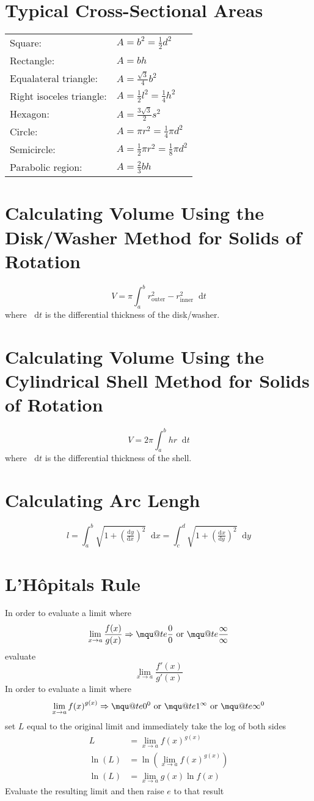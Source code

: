 \documentclass[12pt]{article}
\makeatletter
\renewcommand*{\implies}{\Rightarrow}
\newcommand*{\dd}[3][]{\tfrac{\mathrm{d}^{#1}#2}{\mathrm{d}#3^{#1}}}
\newcommand*{\D}[1]{\mathop{}\!\mathrm{d} #1}
\newcommand{\mquote}[1]{{\mathpalette\mqu@te{#1}}}
\newcommand{\mqu@te}[2]{%
  \sbox0{\(\m@th#1\text{``}\)}%
  \sbox1{\(\m@th#1\text{''}\)}%
  \sbox2{\(\m@th#1#2\)}%
  \ifdim\ht2>\ht0
    \raisebox{\dimexpr\ht2-\height}{\box0}%
    #2%
    \raisebox{\dimexpr\ht2-\height}{\box1}%
  \else
    \box0 #2\box1
  \fi
}
\newenvironment{rmbskip}{\setlength{\belowdisplayskip}{0pt}\ignorespaces}%
  {\ignorespacesafterend}
\makeatother
\begin{document}
\section*{Typical Cross-Sectional Areas}
{\renewcommand{\arraystretch}{1.5}\begin{tabular}{l@{ }l}
  Square: & \(A = b^2 = \frac{1}{2}d^2\)\\
  Rectangle: & \(A = bh\)\\
  Equalateral triangle: & \(A = \frac{\sqrt{3}}{4}b^2\)\\
  Right isoceles triangle: & \(A = \frac{1}{2}l^2 = \frac{1}{4}h^2\)\\
  Hexagon: & \(A = \frac{3\sqrt{3}}{2} s^2\)\\
  Circle: & \(A = \pi r^2 = \frac{1}{4}\pi d^2\)\\
  Semicircle: & \(A = \frac{1}{2}\pi r^2 = \frac{1}{8}\pi d^2\)\\
  Parabolic region: & \(A = \frac{2}{3}bh\)
\end{tabular}}
\section*{Calculating Volume Using the Disk\slash Washer Method for Solids of
Rotation}
\[
  V = \pi\int_a^b r_{\text{outer}}^2 - r_{\text{inner}}^2 \D{t}
\]
where \(\D{t}\) is the differential thickness of the disk\slash washer.
\section*{Calculating Volume Using the Cylindrical Shell Method for Solids of
Rotation}
\[
  V = 2\pi \int_a^b hr \D{t}
\]
where \(\D{t}\) is the differential thickness of the shell.
\section*{Calculating Arc Lengh}
\begin{rmbskip}
  \[
    l = \int_a^b \sqrt{1+{\left(\dd{y}{x}\right)}^2} \D{x}
    = \int_c^d \sqrt{1+{\left(\dd{x}{y}\right)}^2} \D{y}
  \]
\end{rmbskip}
\section*{L'H\^{o}pitals Rule}
In order to evaluate a limit where
\[
  \lim_{x \to a} \frac{f(x)}{g(x)} \implies \mquote{\frac{0}{0}} \text{ or }
  \mquote{\frac{\infty}{\infty}}
\]
evaluate
\[
  \lim_{x \to a} \frac{f'(x)}{g'(x)}
\]
In order to evaluate a limit where
\[
  \lim_{x \to a} {f(x)}^{g(x)} \implies \mquote{0^0} \text{ or }
  \mquote{1^\infty} \text{ or } \mquote{\infty^0}
\]
set \(L\) equal to the original limit and immediately take the log of both
sides
\begin{align*}
  L &= \lim_{x \to a} {f(x)}^{g(x)}\\
  \ln(L) &= \ln\left(\lim_{x \to a} {f(x)}^{g(x)}\right)\\
  \ln(L) &= \lim_{x \to a} g(x) \ln f(x)
\end{align*}
Evaluate the resulting limit and then raise \(e\) to that result
\end{document}
